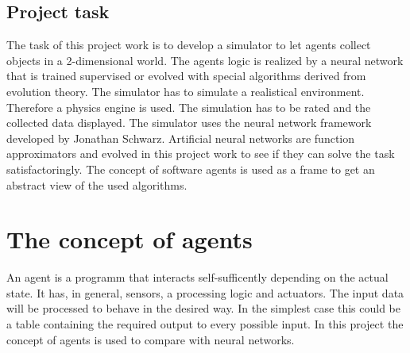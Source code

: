 \documentclass[10pt,a4paper,DIV=11]{scrreprt}
\begin{document}




\section{Project task}
The task of this project work is to develop a simulator to let agents collect objects in a 2-dimensional world. The agents logic is realized  by a neural network that is trained supervised or evolved with special algorithms derived from evolution theory.
The simulator has to simulate a realistical environment. Therefore a physics engine is used.
The simulation has to be rated and the collected data displayed. The simulator uses the neural network framework developed by Jonathan Schwarz.
Artificial neural networks are function approximators and evolved in this project work to see if they can solve the task satisfactoringly.
The concept of software agents is used as a frame to get an abstract view of the used algorithms. \\




\chapter{The concept of agents}
An agent is a programm that interacts self-sufficently depending on the actual state. It has, in general, sensors, a processing logic and actuators. The input data will be processed to behave in the desired way. In the simplest case this could be a table containing the required output to every possible input. In this project the concept of agents is used to compare with neural networks.
\end{document}
